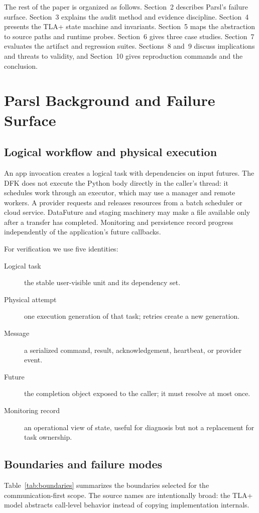 \documentclass[11pt,a4paper]{article}
\begin{document}
The rest of the paper is organized as follows. Section~2 describes Parsl's failure surface.
Section~3 explains the audit method and evidence discipline. Section~4 presents the TLA+ state
machine and invariants. Section~5 maps the abstraction to source paths and runtime probes.
Section~6 gives three case studies. Section~7 evaluates the artifact and regression suites.
Sections~8 and~9 discuss implications and threats to validity, and Section~10 gives reproduction
commands and the conclusion.

\section{Parsl Background and Failure Surface}
\subsection{Logical workflow and physical execution}
An app invocation creates a logical task with dependencies on input futures. The DFK does not
execute the Python body directly in the caller's thread: it schedules work through an executor,
which may use a manager and remote workers. A provider requests and releases resources from a batch
scheduler or cloud service. DataFuture and staging machinery may make a file available only after a
transfer has completed. Monitoring and persistence record progress independently of the application's
future callbacks.

For verification we use five identities:
\begin{description}
  \item[Logical task] the stable user-visible unit and its dependency set.
  \item[Physical attempt] one execution generation of that task; retries create a new generation.
  \item[Message] a serialized command, result, acknowledgement, heartbeat, or provider event.
  \item[Future] the completion object exposed to the caller; it must resolve at most once.
  \item[Monitoring record] an operational view of state, useful for diagnosis but not a replacement
        for task ownership.
\end{description}

\subsection{Boundaries and failure modes}
Table~\ref{tab:boundaries} summarizes the boundaries selected for the communication-first scope.
The source names are intentionally broad: the TLA+ model abstracts call-level behavior instead of
copying implementation internals.
\end{document}
